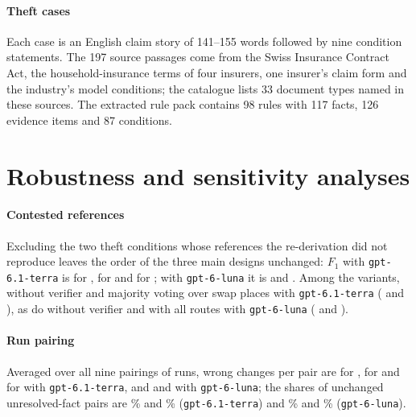 \paragraph{Theft cases}
Each case is an English claim story of 141--155 words followed by nine condition statements. The 197 source passages come from the Swiss Insurance Contract Act, the household-insurance terms of four insurers, one insurer's claim form and the industry's model conditions; the catalogue lists 33 document types named in these sources. The extracted rule pack contains 98 rules with 117 facts, 126 evidence items and 87 conditions.

\section{Robustness and sensitivity analyses}
\label{app:robustness}

\paragraph{Contested references}
Excluding the two theft conditions whose references the re-derivation did not reproduce leaves the order of the three main designs unchanged: $F_1$ with \texttt{gpt-6.1-terra} is \thTerraRAgreedFone{} for , \thTerraCPAgreedFone{} for \casepath and \thTerraDAgreedFone{} for ; with \texttt{gpt-6-luna} it is \thLunaRAgreedFone{} and \thLunaCPAgreedFone. Among the variants, \casepath without verifier and majority voting over  swap places with \texttt{gpt-6.1-terra} (\thTerraCPnAgreedFone{} and \thTerraDscAgreedFone), as do \casepath without verifier and \casepath with all routes with \texttt{gpt-6-luna} (\thLunaCPnAgreedFone{} and \thLunaCPallAgreedFone).

\paragraph{Run pairing}
Averaged over all nine pairings of runs, wrong changes per pair are \thTerraCPAllPairWrongPP{} for \casepath, \thTerraRAllPairWrongPP{} for  and \thTerraDAllPairWrongPP{} for  with \texttt{gpt-6.1-terra}, and \thLunaCPAllPairWrongPP{} and \thLunaRAllPairWrongPP{} with \texttt{gpt-6-luna}; the shares of unchanged unresolved-fact pairs are \thTerraCPAllPairStable\% and \thTerraRAllPairStable\% (\texttt{gpt-6.1-terra}) and \thLunaCPAllPairStable\% and \thLunaRAllPairStable\% (\texttt{gpt-6-luna}).

